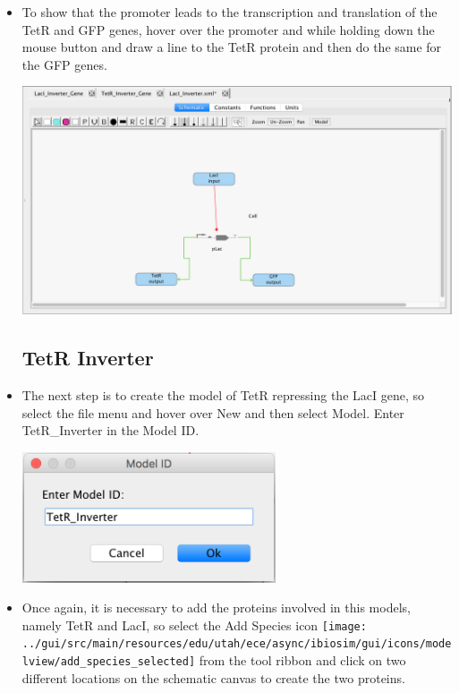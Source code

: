 \documentclass[titlepage,11pt]{article}
\begin{document}
\begin{itemize}
\item To show that the promoter leads to the transcription and translation of the TetR and GFP genes, hover over the promoter and while holding down the mouse button and draw a line to the TetR protein and then do the same for the GFP genes.

\begin{center}
\includegraphics[width=160mm]{"screenshots/LacI Inverter Complete"}
\end{center}

\subsection{TetR Inverter}
\item The next step is to create the model of TetR repressing the LacI gene, so select the file menu and hover over New and then select Model. Enter TetR\_Inverter in the Model ID.

\begin{center}
\includegraphics[width=75mm]{screenshots/ModelTetRId}
\end{center}

\item Once again, it is necessary to add the proteins involved in this models, namely TetR and LacI, so select the Add Species icon \texttt{[image: ../gui/src/main/resources/edu/utah/ece/async/ibiosim/gui/icons/modelview/add\_species\_selected]} from the tool ribbon and click on two different locations on the schematic canvas to create the two proteins.


\end{itemize}
\end{document}
